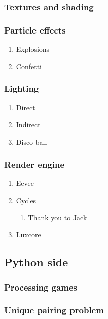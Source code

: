 \documentclass[11pt]{article}
\begin{document}
\subsubsection{Textures and shading}
\label{sec:orgf2a96e7}
\subsubsection{Particle effects}
\label{sec:orgcc3f50b}
\begin{enumerate}
\item Explosions
\label{sec:org2f5b2bd}
\item Confetti
\label{sec:orgf9dbb54}
\end{enumerate}
\subsubsection{Lighting}
\label{sec:org4ca82ba}
\begin{enumerate}
\item Direct
\label{sec:org7e7b9d0}
\item Indirect
\label{sec:org1989bbf}
\item Disco ball
\label{sec:org0755980}
\end{enumerate}
\subsubsection{Render engine}
\label{sec:org9398bca}
\begin{enumerate}
\item Eevee
\label{sec:org7575c9e}
\item Cycles
\label{sec:orgaa573e4}
\begin{enumerate}
\item Thank you to Jack
\label{sec:org9e6ef0f}
\end{enumerate}
\item Luxcore
\label{sec:orga6d0213}
\end{enumerate}
\subsection{Python side}
\label{sec:org20f1376}
\subsubsection{Processing games}
\label{sec:org07b117c}
\subsubsection{Unique pairing problem}
\label{sec:org6a206e2}
\end{document}
